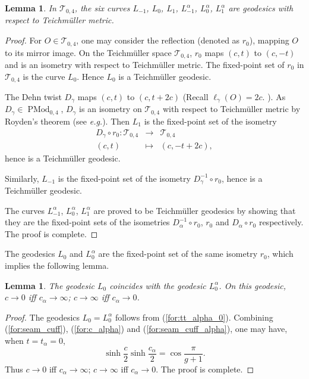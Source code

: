\documentclass[UTF8]{amsart}
\newtheorem{lemma}[theorem]{Lemma}
\numberwithin{equation}{section}
\theoremstyle{definition}
\theoremstyle{example}
\theoremstyle{remark}
\DeclareMathOperator{\pmodo}{PMod}
\begin{document}
\begin{lemma}
 In $\mathcal{T}_{0,4}$, the six curves
 $L_{-1}$, $L_0$, $L_1$, $L_{-1}^{\alpha}$, $L_0^{\alpha}$, $L_1^{\alpha}$
 are geodesics with respect to Teichm\"uller metric. 
 \label{lem:geod}
\end{lemma}
\begin{proof}
 For $O \in \mathcal{T}_{0,4}$, one may consider the reflection (denoted as $r_0$), mapping $O$ to its mirror image. On the Teichm\"uller space $\mathcal{T}_{0,4}$, $r_0$ maps $(c,t)$ to $(c,-t)$ and is an isometry with respect to Teichm\"uller metric. The fixed-point set of $r_0$ in $\mathcal{T}_{0,4}$ is the curve $L_0$. Hence $L_0$ is a Teichm\"uller geodesic. 

The Dehn twist $D_{\gamma}$ maps $(c,t)$ to $(c, t+2c)$ (Recall $\ell_{\gamma}(O) =2c$. ). As $D_{\gamma} \in \pmodo_{0,4}$, $D_{\gamma}$ is an isometry on $\mathcal{T}_{0,4}$ with respect to Teichm\"uller metric by Royden's theorem (see \emph{e.g.}\cite{royden1971automorphisms}). Then $L_1$ is the fixed-point set  of the isometry
\begin{eqnarray*}
 D_{\gamma} \circ r_0: \mathcal{T}_{0,4} &\to& \mathcal{T}_{0,4} \\
 (c,t) & \mapsto & \left( {c}, -t+2c \right), 
\end{eqnarray*}
hence is a Teichm\"uller geodesic. 

Similarly, $L_{-1}$ is the fixed-point set  of the isometry $D_{\gamma}^{-1} \circ r_0$, hence is a Teichm\"uller geodesic. 

The curves  $L_{-1}^{\alpha}$, $L_{0}^{\alpha}$, $L_{1}^{\alpha}$ are proved to be Teichm\"uller geodesics by showing that they are the fixed-point sets of the isometries $D_{\alpha}^{-1} \circ r_0$, $r_0$ and $D_{\alpha} \circ r_0$ respectively. 
The proof is complete. 
\end{proof}

The geodesics $L_0$ and $L_0^{\alpha}$ are the fixed-point set of the same isometry $r_0$, which implies the following lemma. 

\begin{lemma}
 The geodesic $L_0$ coincides with the geodesic $L_0^{\alpha}$. On this geodesic, $c\to 0$ iff $c_{\alpha} \to \infty$; $c\to \infty$ iff $c_{\alpha} \to 0$. 
 \label{lem:0_coicide}
\end{lemma}
\begin{proof}
 The geodesics $L_0 = L^{\alpha}_0$ follows from (\ref{for:tt_alpha_0}). Combining (\ref{for:seam_cuff}), (\ref{for:c_alpha}) and (\ref{for:seam_cuff_alpha}), one may have, when $t=t_{\alpha}=0$,
 \begin{equation}
 \sinh \frac{c}{2}\sinh \frac{c_{\alpha}}{2} = \cos \frac{\pi}{g+1}. 
 \label{for:cc_alpha_t0} 
 \end{equation}
Thus $c\to 0$ iff $c_{\alpha} \to \infty$; $c\to \infty$ iff $c_{\alpha} \to 0$. The proof is complete. 

\end{proof}
\end{document}
